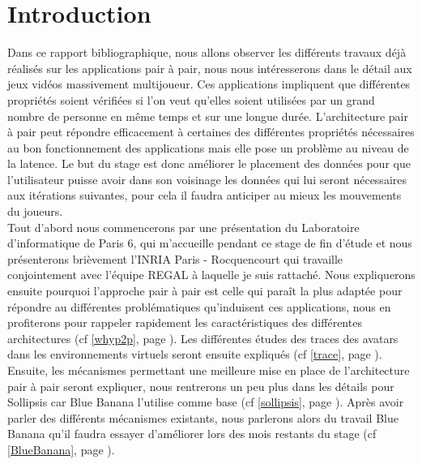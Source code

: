 \section{Introduction}
	Dans ce rapport bibliographique, nous allons observer les différents travaux déjà réalisés sur les applications pair à pair, nous nous intéresserons dans le détail aux jeux vidéos massivement multijoueur. Ces applications impliquent que différentes propriétés soient vérifiées si l'on veut qu'elles soient utilisées par un grand nombre de personne en même temps et sur une longue durée. L'architecture pair à pair peut répondre efficacement à certaines des différentes propriétés nécessaires au bon fonctionnement des applications mais elle pose un problème au niveau de la latence. Le but du stage est donc améliorer le placement des données pour que l'utilisateur puisse avoir dans son voisinage les données qui lui seront nécessaires aux itérations suivantes, pour cela il faudra anticiper au mieux les mouvements du joueurs.\\

	Tout d'abord nous commencerons par une présentation du Laboratoire d'informatique de Paris 6, qui m'accueille pendant ce stage de fin d'étude et nous présenterons brièvement l'INRIA Paris - Rocquencourt qui travaille conjointement avec l'équipe REGAL à laquelle je suis rattaché. Nous expliquerons ensuite pourquoi l'approche pair à pair est celle qui paraît la plus adaptée pour répondre au différentes problématiques qu'induisent ces applications, nous en profiterons pour rappeler rapidement les caractéristiques des différentes architectures (cf \ref{whyp2p}, page \pageref{whyp2p}). Les différentes études des traces des avatars dans les environnements virtuels seront ensuite expliqués (cf \ref{trace}, page \pageref{trace}). Ensuite, les mécanismes permettant une meilleure mise en place de l'architecture pair à pair seront expliquer, nous rentrerons un peu plus dans les détails pour Sollipsis car Blue Banana l'utilise comme base (cf \ref{sollipsis}, page \pageref{sollipsis}). Après avoir parler des différents mécanismes existants, nous parlerons alors du travail Blue Banana qu'il faudra essayer d'améliorer lors des mois restants du stage (cf \ref{BlueBanana}, page \pageref{BlueBanana}).

